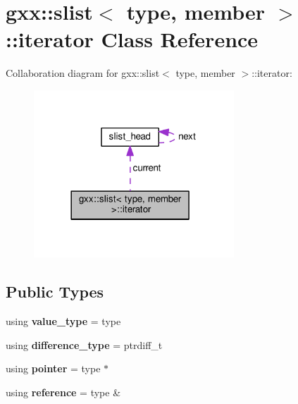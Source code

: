 \hypertarget{classgxx_1_1slist_1_1iterator}{}\section{gxx\+:\+:slist$<$ type, member $>$\+:\+:iterator Class Reference}
\label{classgxx_1_1slist_1_1iterator}


Collaboration diagram for gxx\+:\+:slist$<$ type, member $>$\+:\+:iterator\+:
\nopagebreak
\begin{figure}[H]
\begin{center}
\leavevmode
\includegraphics[width=213pt]{classgxx_1_1slist_1_1iterator__coll__graph}
\end{center}
\end{figure}
\subsection*{Public Types}
\begin{DoxyCompactItemize}
\item 
using {\bfseries value\+\_\+type} = type\hypertarget{classgxx_1_1slist_1_1iterator_acd281a956a7eaef62a5cf96659b747f7}{}\label{classgxx_1_1slist_1_1iterator_acd281a956a7eaef62a5cf96659b747f7}

\item 
using {\bfseries difference\+\_\+type} = ptrdiff\+\_\+t\hypertarget{classgxx_1_1slist_1_1iterator_a9d03ce6d449a898c70a69eeaa9773432}{}\label{classgxx_1_1slist_1_1iterator_a9d03ce6d449a898c70a69eeaa9773432}

\item 
using {\bfseries pointer} = type $\ast$\hypertarget{classgxx_1_1slist_1_1iterator_ab081f836da253cee99f486c08a1b83bd}{}\label{classgxx_1_1slist_1_1iterator_ab081f836da253cee99f486c08a1b83bd}

\item 
using {\bfseries reference} = type \&\hypertarget{classgxx_1_1slist_1_1iterator_ab185b3ee88fcb12b7043f4ef101e52fe}{}\label{classgxx_1_1slist_1_1iterator_ab185b3ee88fcb12b7043f4ef101e52fe}

\end{DoxyCompactItemize}

